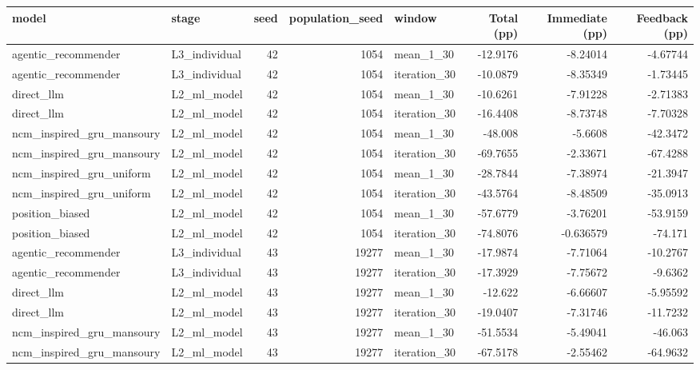 \begin{table}[htbp!]
\centering
\small
\setlength{\tabcolsep}{3pt}
\renewcommand{\arraystretch}{1.1}
\begin{tabular}{llrrlrrr}
\hline
model & stage & seed & population\_seed & window & Total (pp) & Immediate (pp) & Feedback (pp) \\
\hline
agentic\_recommender & L3\_individual & 42 & 1054 & mean\_1\_30 & -12.9176 & -8.24014 & -4.67744 \\
agentic\_recommender & L3\_individual & 42 & 1054 & iteration\_30 & -10.0879 & -8.35349 & -1.73445 \\
direct\_llm & L2\_ml\_model & 42 & 1054 & mean\_1\_30 & -10.6261 & -7.91228 & -2.71383 \\
direct\_llm & L2\_ml\_model & 42 & 1054 & iteration\_30 & -16.4408 & -8.73748 & -7.70328 \\
ncm\_inspired\_gru\_mansoury & L2\_ml\_model & 42 & 1054 & mean\_1\_30 & -48.008 & -5.6608 & -42.3472 \\
ncm\_inspired\_gru\_mansoury & L2\_ml\_model & 42 & 1054 & iteration\_30 & -69.7655 & -2.33671 & -67.4288 \\
ncm\_inspired\_gru\_uniform & L2\_ml\_model & 42 & 1054 & mean\_1\_30 & -28.7844 & -7.38974 & -21.3947 \\
ncm\_inspired\_gru\_uniform & L2\_ml\_model & 42 & 1054 & iteration\_30 & -43.5764 & -8.48509 & -35.0913 \\
position\_biased & L2\_ml\_model & 42 & 1054 & mean\_1\_30 & -57.6779 & -3.76201 & -53.9159 \\
position\_biased & L2\_ml\_model & 42 & 1054 & iteration\_30 & -74.8076 & -0.636579 & -74.171 \\
agentic\_recommender & L3\_individual & 43 & 19277 & mean\_1\_30 & -17.9874 & -7.71064 & -10.2767 \\
agentic\_recommender & L3\_individual & 43 & 19277 & iteration\_30 & -17.3929 & -7.75672 & -9.6362 \\
direct\_llm & L2\_ml\_model & 43 & 19277 & mean\_1\_30 & -12.622 & -6.66607 & -5.95592 \\
direct\_llm & L2\_ml\_model & 43 & 19277 & iteration\_30 & -19.0407 & -7.31746 & -11.7232 \\
ncm\_inspired\_gru\_mansoury & L2\_ml\_model & 43 & 19277 & mean\_1\_30 & -51.5534 & -5.49041 & -46.063 \\
ncm\_inspired\_gru\_mansoury & L2\_ml\_model & 43 & 19277 & iteration\_30 & -67.5178 & -2.55462 & -64.9632 \\

\end{tabular}
\end{table}
